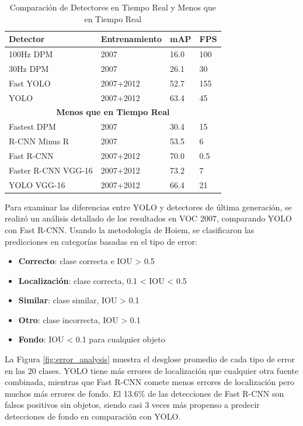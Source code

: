  \begin{table}[H]
 	\centering
 	\caption{Comparación de Detectores en Tiempo Real y Menos que en Tiempo Real}
 	\label{tab:real-time-detectors}
 	\begin{tabular}{|l|l|l|l|}
 		\hline
 		\textbf{Detector} & \textbf{Entrenamiento} & \textbf{mAP} & \textbf{FPS} \\ \hline
 		100Hz DPM \cite{DPM} & 2007 & 16.0 & 100 \\ \hline
 		30Hz DPM \cite{DPM} & 2007 & 26.1 & 30 \\ \hline
 		Fast YOLO & 2007+2012 & 52.7 & 155 \\ \hline
 		YOLO & 2007+2012 & 63.4 & 45 \\ \hline
 		\multicolumn{4}{|c|}{\textbf{Menos que en Tiempo Real}} \\ \hline
 		Fastest DPM \cite{DPM} & 2007 & 30.4 & 15 \\ \hline
 		R-CNN Minus R \cite{RCNN} & 2007 & 53.5 & 6 \\ \hline
 		Fast R-CNN \cite{FastRCNN} & 2007+2012 & 70.0 & 0.5 \\ \hline
 		Faster R-CNN VGG-16 \cite{FasterRCNN} & 2007+2012 & 73.2 & 7 \\ \hline
 		YOLO VGG-16 & 2007+2012 & 66.4 & 21 \\ \hline
 	\end{tabular}
 \end{table}


Para examinar las diferencias entre YOLO y detectores de última generación, se realizó un análisis detallado de los resultados en VOC 2007, comparando YOLO con Fast R-CNN. Usando la metodología de Hoiem, se clasificaron las predicciones en categorías basadas en el tipo de error:

\begin{itemize}
	\item \textbf{Correcto}: clase correcta e IOU > 0.5
	\item \textbf{Localización}: clase correcta, 0.1 < IOU < 0.5
	\item \textbf{Similar}: clase similar, IOU > 0.1
	\item \textbf{Otro}: clase incorrecta, IOU > 0.1
	\item \textbf{Fondo}: IOU < 0.1 para cualquier objeto
\end{itemize}

La Figura \ref{fig:error_analysis} muestra el desglose promedio de cada tipo de error en las 20 clases. YOLO tiene más errores de localización que cualquier otra fuente combinada, mientras que Fast R-CNN comete menos errores de localización pero muchos más errores de fondo. El 13.6\% de las detecciones de Fast R-CNN son falsos positivos sin objetos, siendo casi 3 veces más propenso a predecir detecciones de fondo en comparación con YOLO.

